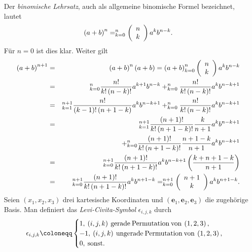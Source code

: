 \documentclass{book}
\let\sum\relax
\DeclareMathOperator*{\sum}{\raisebox{-3.5pt}{\scalebox{2}{\rotatebox{1}{{\bask Σ}}}}}
\begin{document}
Der \textit{binomische Lehrsatz}, auch als allgemeine binomische Formel bezeichnet, lautet
%
\begin{eqnarray}
\left(a + b\right)^n = \sum_{k = 0}^{n}\left(\begin{array}{c}
n\\
k
\end{array}\right)a^kb^{n - k}.\label{eq:gen_bin_formula}
\end{eqnarray}
%
Für $n = 0$ ist dies klar. Weiter gilt
%
\begin{eqnarray}
\left(a + b\right)^{n + 1} & = & \left(a + b\right)^n\left(a + b\right) = \left(a + b\right)\sum_{k = 0}^{n}\left(\begin{array}{c}
n\\
k
\end{array}\right)a^kb^{n - k}\nonumber\\
& = & \sum_{k = 0}^{n}\frac{n!}{k!\left(n - k\right)!}a^{k + 1}b^{n - k} + \sum_{k = 0}^{n}\frac{n!}{k!\left(n - k\right)!}a^kb^{n - k + 1}\nonumber\\
& = & \sum_{k = 1}^{n + 1}\frac{n!}{\left(k - 1\right)!\left(n + 1 - k\right)}a^kb^{n - k + 1} + \sum_{k = 0}^{n}\frac{n!}{k!\left(n - k\right)!}a^kb^{n - k + 1}\nonumber\\
& = & \sum_{k = 1}^{n + 1}\frac{\left(n + 1\right)!}{k!\left(n + 1 - k\right)!}\frac{k}{n + 1}a^kb^{n - k + 1}\nonumber\\
&&+ \sum_{k = 0}^{n}\frac{\left(n + 1\right)!}{k!\left(n + 1 - k\right)!}\frac{n + 1 - k}{n + 1}a^kb^{n - k + 1}\nonumber\\
& = & \sum_{k = 0}^{n + 1}\frac{\left(n + 1\right)!}{k!\left(n + 1 - k\right)!}a^kb^{n - k + 1}\left(\frac{k + n + 1 - k}{n + 1}\right)\nonumber\\
& = & \sum_{k = 0}^{n + 1}\frac{\left(n + 1\right)!}{k!\left(n + 1 - k\right)!}a^kb^{n + 1 - k} = \sum_{k = 0}^{n + 1}\left(\begin{array}{c}
n + 1\\
k
\end{array}\right)a^kb^{n + 1 - k}.
\end{eqnarray}
%
Seien $\left(x_1, x_2, x_3\right)$ drei kartesische Koordinaten und $\left(\mathbf{e}_1, \mathbf{e}_2, \mathbf{e}_3\right)$ die zugehörige Basis. Man definiert das \textit{Levi-Civita-Symbol} $\epsilon_{i, j, k}$ durch
%
\begin{eqnarray}
\epsilon_{i, j, k} \coloneqq \begin{cases}
1, \:\left(i, j, k\right)\text{\:gerade\:Permutation\:von\:}\left(1, 2, 3\right),\\
- 1, \:\left(i, j, k\right)\text{\:ungerade\:Permutation\:von\:}\left(1, 2, 3\right),\\
0, \:\text{sonst}.
\end{cases}
\end{eqnarray}
\end{document}
